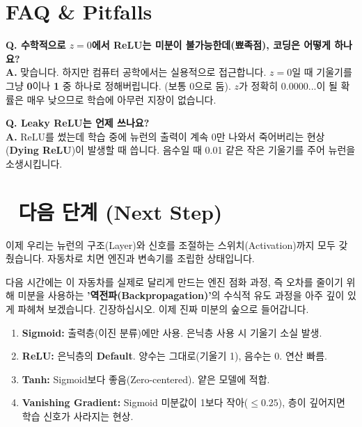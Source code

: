 \documentclass[11pt,a4paper]{book}
\theoremstyle{definition}
\begin{document}
\section{FAQ \& Pitfalls}

\begin{warningbox}[title={ReLU의 미분 불가능 점 ($z=0$)}]
\textbf{Q. 수학적으로 $z=0$에서 ReLU는 미분이 불가능한데(뾰족점), 코딩은 어떻게 하나요?} \\
\textbf{A.} 맞습니다. 하지만 컴퓨터 공학에서는 실용적으로 접근합니다. $z=0$일 때 기울기를 그냥 \textbf{0}이나 \textbf{1} 중 하나로 정해버립니다. (보통 0으로 둠). $z$가 정확히 0.0000...이 될 확률은 매우 낮으므로 학습에 아무런 지장이 없습니다.
\end{warningbox}

\textbf{Q. Leaky ReLU는 언제 쓰나요?} \\
\textbf{A.} ReLU를 썼는데 학습 중에 뉴런의 출력이 계속 0만 나와서 죽어버리는 현상(\textbf{Dying ReLU})이 발생할 때 씁니다. 음수일 때 0.01 같은 작은 기울기를 주어 뉴런을 소생시킵니다.

\section*{🔗 다음 단계 (Next Step)}
이제 우리는 뉴런의 구조(Layer)와 신호를 조절하는 스위치(Activation)까지 모두 갖췄습니다. 자동차로 치면 엔진과 변속기를 조립한 상태입니다.

다음 시간에는 이 자동차를 실제로 달리게 만드는 엔진 점화 과정, 즉 오차를 줄이기 위해 미분을 사용하는 \textbf{'역전파(Backpropagation)'}의 수식적 유도 과정을 아주 깊이 있게 파헤쳐 보겠습니다. 긴장하십시오. 이제 진짜 미분의 숲으로 들어갑니다.

\vspace{0.5cm}

\begin{summarybox}[title={단원 요약 (Cheat Sheet)}]
\begin{enumerate}
    \item \textbf{Sigmoid:} 출력층(이진 분류)에만 사용. 은닉층 사용 시 기울기 소실 발생.
    \item \textbf{ReLU:} 은닉층의 \textbf{Default}. 양수는 그대로(기울기 1), 음수는 0. 연산 빠름.
    \item \textbf{Tanh:} Sigmoid보다 좋음(Zero-centered). 얕은 모델에 적합.
    \item \textbf{Vanishing Gradient:} Sigmoid 미분값이 1보다 작아($\le 0.25$), 층이 깊어지면 학습 신호가 사라지는 현상.
\end{enumerate}
\end{summarybox}
\end{document}
